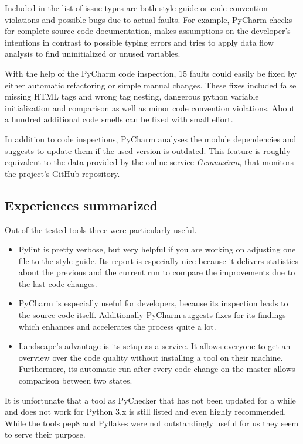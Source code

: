 Included in the list of issue types are both style guide or code convention violations and possible bugs due to actual faults.
For example, PyCharm checks for complete source code documentation, makes assumptions on the developer's intentions in contrast to possible typing errors and tries to apply data flow analysis to find uninitialized or unused variables.

With the help of the PyCharm code inspection, 15 faults could easily be fixed by either automatic refactoring or simple manual changes.
These fixes included false missing HTML tags and wrong tag nesting, dangerous python variable initialization and comparison as well as minor code convention violations.
About a hundred additional code smells can be fixed with small effort.

In addition to code inspections, PyCharm analyses the module dependencies and suggests to update them if the used version is outdated.
This feature is roughly equivalent to the data provided by the online service \textit{Gemnasium}, that monitors the project's GitHub repository.

\subsection{Experiences summarized}
Out of the tested tools three were particularly useful.

\begin{itemize}
    \item Pylint is pretty verbose, but very helpful if you are working on adjusting one file to the style guide.
    Its report is especially nice because it delivers statistics about the previous and the current run to compare the improvements due to the last code changes.
    \item PyCharm is especially useful for developers, because its inspection leads to the source code itself.
    Additionally PyCharm suggests fixes for its findings which enhances and accelerates the process quite a lot.
    \item Landscape's advantage is its setup as a service. It allows everyone to get an overview over the code quality without installing a tool on their machine. Furthermore, its automatic run after every code change on the master allows comparison between two states.
\end{itemize}

It is unfortunate that a tool as PyChecker that has not been updated for a while and does not work for Python 3.x is still listed and even highly recommended.  
While the tools pep8 and Pyflakes were not outstandingly useful for us they seem to serve their purpose.

